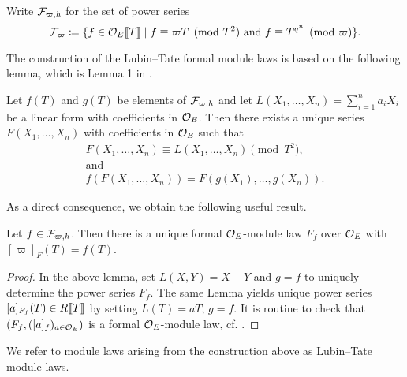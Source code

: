 \documentclass[../main.tex]{subfiles}
\begin{document}
Write $\mathcal{F}_{\varpi, h}$ for the set of power series
\begin{equation*}
  \mathcal{F}_\varpi \coloneqq \{f \in \mathcal{O}_E \llbracket T \rrbracket \mid f \equiv \varpi T \pmod {T^2}
  \text{ and } f \equiv T^{q^n} \pmod \varpi\}. 
\end{equation*}

The construction of the Lubin--Tate formal module laws is based on the following 
lemma, which is Lemma 1 in \cite{LubinTateFormalMult}.
\begin{lem}\label{lem:LTLemma1}
  Let $f(T)$ and $g(T)$ be elements of $\mathcal{F}_{\varpi,h}$ and let 
  $L(X_1, \dots, X_n) = \sum_{i=1}^n a_i X_i$ be a linear form with coefficients in 
  ${\mathcal{O}_E}$. Then there exists a unique series $F(X_1, \dots, X_n)$ with coefficients 
  in ${\mathcal{O}_E}$ such that 
  \begin{gather*}
    F(X_1, \dots, X_n) \equiv L(X_1, \dots, X_n) \pmod {T^2}, \\ \text{and} \\
    f(F(X_1, \dots, X_n)) = F(g(X_1), \dots, g(X_n)).
  \end{gather*}
\end{lem}

As a direct consequence, we obtain the following useful result.
\begin{lem}
  Let $f \in \mathcal{F}_{\varpi, h}$. Then there is a unique formal ${\mathcal{O}_E}$-module law $F_f$ over ${\mathcal{O}_E}$
  with $[\varpi]_F(T) = f(T)$.
\begin{proof}
  In the above lemma, set $L(X,Y) = X+Y$ and $g=f$ to uniquely determine 
  the power series $F_f$. The same Lemma yields unique power series
  $[a]_{F_f}(T) \in R\llbracket T \rrbracket$ by setting $L(T) = a T$, $g=f$. It is
  routine to check that $(F_f, ([a]_f)_{a \in {\mathcal{O}_E}})$ is a formal ${\mathcal{O}_E}$-module law, 
  cf. \cite{LubinTateFormalMult}.
\end{proof}
\end{lem}

\begin{defi}
  We refer to module laws arising from the construction above as Lubin--Tate module laws.
\end{defi}
\end{document}
